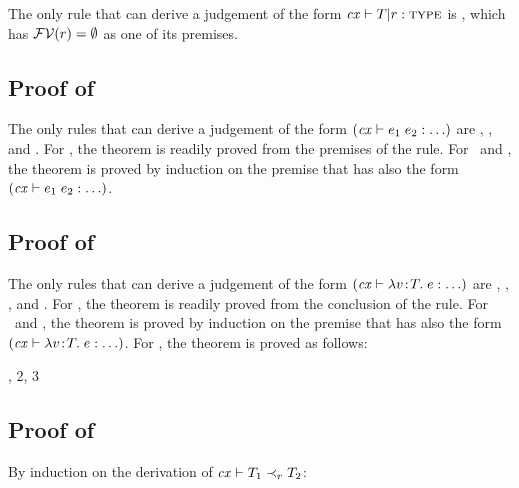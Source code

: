 The only rule that can derive a judgement of the form $\mathit{cx}\vdash T|r:\textsc{type}$ is
\Rtsub, which has $\mathcal{FV}(r)=\emptyset$ as one of its premises.



\subsection*{Proof of }

The only rules that can derive a judgement of the form $(\mathit{cx}\vdash e_1\;e_2:\ldots)$
are \Reapp, \Resuper, and \Resub. For \Reapp, the theorem is readily proved
from the premises of the rule. For \Resuper\ and \Resub, the theorem is proved
by induction on the premise that has also the form $(\mathit{cx}\vdash e_1\;e_2:\ldots)$.



\subsection*{Proof of }

The only rules that can derive a judgement of the form $(\mathit{cx}\vdash\lambda v\!:\!T.\;e:\ldots)$
are \Reabs, \Resuper, \Resub, and \Reabsalpha. For \Reabs, the theorem is
readily proved from the conclusion of the rule. For \Resuper\ and \Resub, the
theorem is proved by induction on the premise that has also the form
$(\mathit{cx}\vdash\lambda v\!:\!T.\;e:\ldots)$. For \Reabsalpha, the theorem is proved as follows:
\begin{derivation}
\step{\hastyOany{\absO}}{\premof{\Reabsalpha}}
     {\Reabsalpha, 2, 3}
\end{derivation}



\subsection*{Proof of }

By induction on the derivation of $\mathit{cx}\vdash T_1\prec_{r}T_2$:

